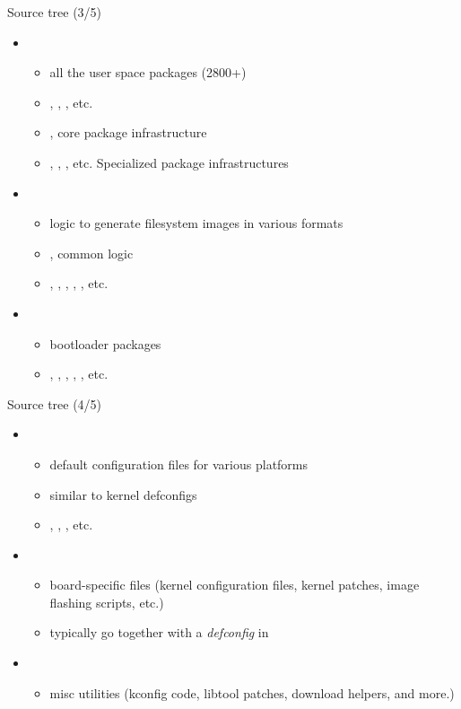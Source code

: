 \begin{frame}{Source tree (3/5)}
  \begin{itemize}
  \item {}
    \begin{itemize}
    \item all the user space packages (2800+)
    \item {}, , , etc.
    \item {}, core package infrastructure
    \item {}, ,
      , etc. Specialized package infrastructures
    \end{itemize}
  \item {}
    \begin{itemize}
    \item logic to generate filesystem images in various formats
    \item {}, common logic
    \item {}, , , ,
      , etc.
    \end{itemize}
  \item {}
    \begin{itemize}
    \item bootloader packages
    \item {}, , ,
      , , etc.
    \end{itemize}
  \end{itemize}
\end{frame}

\begin{frame}{Source tree (4/5)}
  \begin{itemize}
  \item {}
    \begin{itemize}
    \item default configuration files for various platforms
    \item similar to kernel defconfigs
    \item {},
      , , etc.
    \end{itemize}
  \item {}
    \begin{itemize}
    \item board-specific files (kernel configuration files, kernel
      patches, image flashing scripts, etc.)
    \item typically go together with a {\em defconfig} in
    \end{itemize}
  \item {}
    \begin{itemize}
    \item misc utilities (kconfig code, libtool patches, download
      helpers, and more.)
    \end{itemize}
  \end{itemize}
\end{frame}

